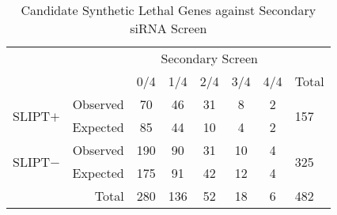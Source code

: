 \begin{table*}[!ht]
\caption{Candidate Synthetic Lethal Genes against Secondary siRNA Screen}
\label{tab:secondary_screen}
\begin{center}
\begin{tabular}{rrcccccl}
                                             &                               & \multicolumn{5}{c}{Secondary Screen}                                                                                               &                                           \\ \cline{3-7}
                                             & \multicolumn{1}{r|}{}         & 0/4                      & 1/4                      & 2/4                     & 3/4                     & \multicolumn{1}{c|}{4/4} & Total                                     \\ \cline{2-8} 
\multicolumn{1}{r|}{\multirow{2}{*}{SLIPT$+$}} & \multicolumn{1}{r|}{Observed} & 70                       & 46                       & 31                      & 8                       & \multicolumn{1}{c|}{2}   & \multicolumn{1}{l|}{\multirow{2}{*}{157}} \\
\multicolumn{1}{r|}{}                        & \multicolumn{1}{r|}{Expected} & 85                       & 44                       & 10                      & 4                       & \multicolumn{1}{c|}{2}   & \multicolumn{1}{l|}{}                     \\ \cline{2-8} 
\multicolumn{1}{r|}{\multirow{2}{*}{SLIPT$-$}} & \multicolumn{1}{r|}{Observed} & 190                      & 90                       & 31                      & 10                      & \multicolumn{1}{c|}{4}   & \multicolumn{1}{l|}{\multirow{2}{*}{325}} \\
\multicolumn{1}{r|}{}                        & \multicolumn{1}{r|}{Expected} & 175                      & 91                       & 42                      & 12                      & \multicolumn{1}{c|}{4}   & \multicolumn{1}{l|}{}                     \\ \cline{2-8} 
                                             & \multicolumn{1}{r|}{Total}    & \multicolumn{1}{c}{280} & \multicolumn{1}{c}{136} & \multicolumn{1}{c}{52} & \multicolumn{1}{c}{18} & \multicolumn{1}{c|}{6}   & \multicolumn{1}{l|}{482}                  \\ \cline{3-8} 
\end{tabular}
\end{center}
\end{table*}
